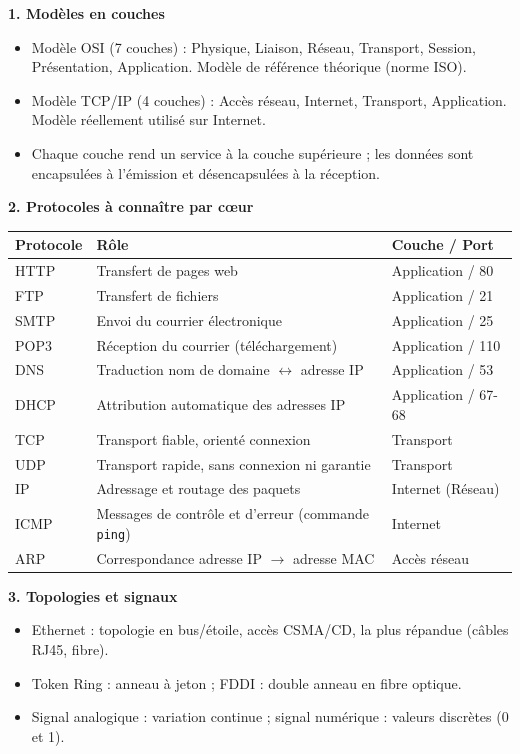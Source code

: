 \documentclass[11pt]{article}
\newcommand{\cle}[1]{{\popxbold\color{popdark}#1}}
\begin{document}
\begin{bilan}
\textbf{1. Modèles en couches}
\begin{itemize}
  \item \cle{Modèle OSI} (7 couches) : Physique, Liaison, Réseau, Transport, Session, Présentation, Application. Modèle de référence théorique (norme ISO).
  \item \cle{Modèle TCP/IP} (4 couches) : Accès réseau, Internet, Transport, Application. Modèle réellement utilisé sur Internet.
  \item Chaque couche rend un service à la couche supérieure ; les données sont encapsulées à l'émission et désencapsulées à la réception.
\end{itemize}

\textbf{2. Protocoles à connaître par cœur}
\begin{center}
\begin{tabularx}{\linewidth}{|l|X|l|}
\hline
\rowcolor{popblueL} \textbf{Protocole} & \textbf{Rôle} & \textbf{Couche / Port} \\
\hline
HTTP & Transfert de pages web & Application / 80 \\
\hline
FTP & Transfert de fichiers & Application / 21 \\
\hline
SMTP & Envoi du courrier électronique & Application / 25 \\
\hline
POP3 & Réception du courrier (téléchargement) & Application / 110 \\
\hline
DNS & Traduction nom de domaine $\leftrightarrow$ adresse IP & Application / 53 \\
\hline
DHCP & Attribution automatique des adresses IP & Application / 67-68 \\
\hline
TCP & Transport fiable, orienté connexion & Transport \\
\hline
UDP & Transport rapide, sans connexion ni garantie & Transport \\
\hline
IP & Adressage et routage des paquets & Internet (Réseau) \\
\hline
ICMP & Messages de contrôle et d'erreur (commande \texttt{ping}) & Internet \\
\hline
ARP & Correspondance adresse IP $\rightarrow$ adresse MAC & Accès réseau \\
\hline
\end{tabularx}
\end{center}

\textbf{3. Topologies et signaux}
\begin{itemize}
  \item \cle{Ethernet} : topologie en bus/étoile, accès CSMA/CD, la plus répandue (câbles RJ45, fibre).
  \item \cle{Token Ring} : anneau à jeton ; \cle{FDDI} : double anneau en fibre optique.
  \item Signal \cle{analogique} : variation continue ; signal \cle{numérique} : valeurs discrètes (0 et 1).
\end{itemize}


\end{bilan}
\end{document}
